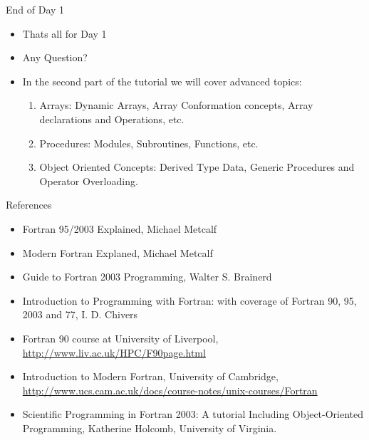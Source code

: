 \documentclass[10pt,t]{beamer}
\begin{document}
\begin{frame}{End of Day 1}
  \begin{itemize}
    \item Thats all for Day 1
    \item Any Question?
    \item In the second part of the tutorial we will cover advanced topics:
      \begin{enumerate}
        \item Arrays: Dynamic Arrays, Array Conformation concepts, Array declarations and Operations, etc.
        \item Procedures: Modules, Subroutines, Functions, etc.
        \item Object Oriented Concepts: Derived Type Data, Generic Procedures and Operator Overloading.
      \end{enumerate}
  \end{itemize}
\end{frame}
\begin{frame}{References}
  \begin{itemize}
    \item Fortran 95/2003 Explained, Michael Metcalf
    \item Modern Fortran Explaned, Michael Metcalf
    \item Guide to Fortran 2003 Programming, Walter S. Brainerd
    \item Introduction to Programming with Fortran: with coverage of Fortran 90, 95, 2003 and 77, I. D. Chivers
    \item Fortran 90 course at University of Liverpool, \url{http://www.liv.ac.uk/HPC/F90page.html}
    \item Introduction to Modern Fortran, University of Cambridge, \url{http://www.ucs.cam.ac.uk/docs/course-notes/unix-courses/Fortran}
    \item Scientific Programming in Fortran 2003: A tutorial Including Object-Oriented Programming, Katherine Holcomb, University of Virginia.
  \end{itemize}
\end{frame}
\end{document}

